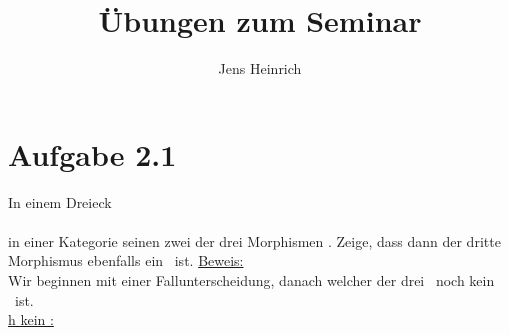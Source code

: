 \documentclass{article}
\title{\"Ubungen zum Seminar \boldfont{Kategorientheorie} }
\author{Jens Heinrich}
\begin{document}
 

\section*{Aufgabe 2.1}
	In einem Dreieck 
	\\
	
	\\
	in einer Kategorie seinen zwei der drei Morphismen \Ison.
	Zeige, dass dann der dritte Morphismus ebenfalls ein \Iso \ ist.
	\underline{Beweis:} \\
		Wir beginnen mit einer Fallunterscheidung, danach welcher der drei \Morn \ noch kein \Iso \ ist.
		\\
		\underline{h kein \Iso :}
		\\
		
\end{document}
